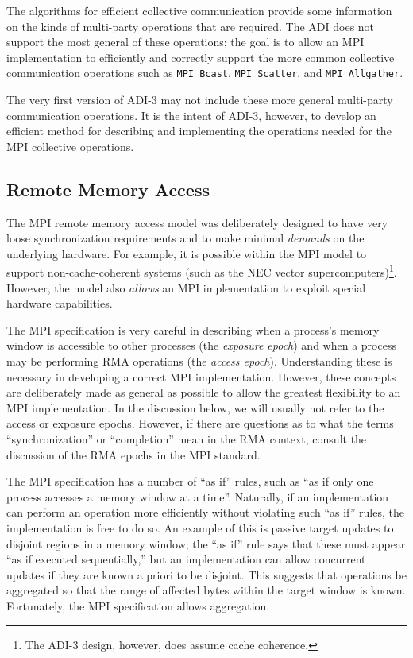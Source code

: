 \documentclass{article}
\def\code#1{\texttt{#1}}
\begin{document}
The algorithms for efficient collective communication provide some
information on the kinds of multi-party operations that are required.
The ADI does not support the most general of these operations; the
goal is to allow an MPI implementation to efficiently and correctly
support the more common collective communication operations such as
\code{MPI_Bcast}, \code{MPI_Scatter}, and \code{MPI_Allgather}.

The very first version of ADI-3 may not include these more general
multi-party communication operations.  It is the intent of ADI-3,
however, to develop an efficient method for describing and
implementing the operations needed for the MPI collective operations.

\subsection{Remote Memory Access}
\label{sec:rma-design}
The MPI remote memory access model was deliberately designed to have
very loose synchronization requirements and to make minimal \emph{demands} on
the 
underlying hardware.  For example, it is possible within the MPI model
to support non-cache-coherent systems (such as the NEC vector
supercomputers)\footnote{The ADI-3 design, however, does assume cache
coherence.}.  However, the model also \emph{allows} an MPI 
implementation to exploit special hardware capabilities.  

%
The MPI specification is very careful in describing when a process's
memory window is accessible to other processes (the \emph{exposure
epoch}) and when a process may be performing RMA operations (the
\emph{access epoch}).  Understanding these is necessary in developing
a correct MPI implementation.  However, these concepts are
deliberately made as general as possible to allow the greatest
flexibility to an MPI implementation.  In the discussion below, we
will usually not refer to the access or exposure epochs.  However, if
there are questions as to what the terms ``synchronization'' or
``completion'' mean in the RMA context, consult the discussion of the
RMA epochs in the MPI standard.

The MPI specification has a number of ``as if'' rules, such as ``as if
only one process accesses a memory window at a time''.  Naturally, if
an implementation can perform an operation more efficiently without
violating such ``as if'' rules, the implementation is free to do so.
An example of this is passive target updates to disjoint regions in a
memory window; 
the ``as if'' rule says that these must appear ``as if executed
sequentially,'' but an implementation can allow concurrent updates if
they are known a priori to be disjoint.  This suggests that operations
be aggregated so that the range of affected bytes within the target
window is known.  Fortunately, the MPI specification allows aggregation.
\end{document}
